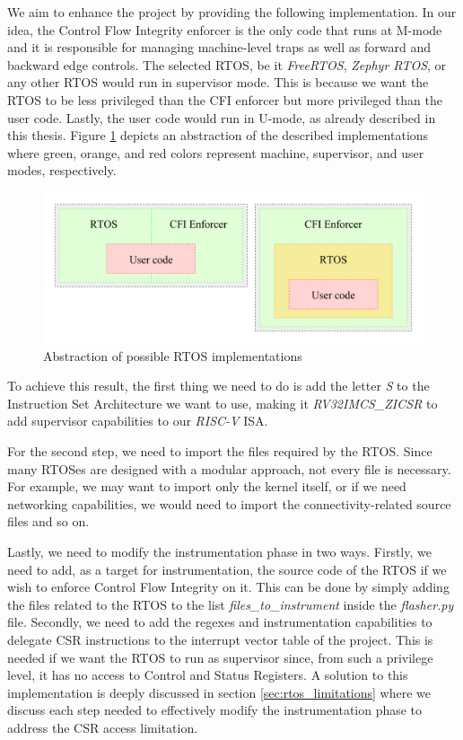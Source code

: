We aim to enhance the project by providing the following implementation. In our
idea, the Control Flow Integrity enforcer is the only code that runs at M-mode and
it is responsible for managing machine-level traps as well as forward and backward
edge controls. The selected RTOS, be it \textit{FreeRTOS}, \textit{Zephyr RTOS},
or any other RTOS would run in supervisor mode. This is because we want the RTOS
to be less privileged than the CFI enforcer but more privileged than the user
code. Lastly, the user code would run in U-mode, as already described in this thesis.
Figure \ref{fig:rtos} depicts an abstraction of the described implementations
where green, orange, and red colors represent machine, supervisor, and user
modes, respectively. \\
\begin{figure}[htbp]
  \centering
  \includegraphics[width=\linewidth]{images/rtos.png}
  \caption{Abstraction of possible RTOS implementations}
  \label{fig:rtos}
\end{figure}

To achieve this result, the first thing we need to do is add the letter \textit{S}
to the Instruction Set Architecture we want to use, making it \textit{RV32IMCS\_ZICSR}
to add supervisor capabilities to our \textit{RISC-V} ISA.

For the second step, we need to import the files required by the RTOS. Since
many RTOSes are designed with a modular approach, not every file is necessary.
For example, we may want to import only the kernel itself, or if we need
networking capabilities, we would need to import the connectivity-related source
files and so on.

Lastly, we need to modify the instrumentation phase in two ways. Firstly, we
need to add, as a target for instrumentation, the source code of the RTOS if we
wish to enforce Control Flow Integrity on it. This can be done by simply adding the
files related to the RTOS to the list \textit{files\_to\_instrument} inside the
\textit{flasher.py} file. Secondly, we need to add the regexes and instrumentation
capabilities to delegate CSR instructions to the interrupt vector table of the project.
This is needed if we want the RTOS to run as supervisor since, from such a privilege
level, it has no access to Control and Status Registers. A solution to this implementation
is deeply discussed in section \ref{sec:rtos_limitations} where we discuss each step
needed to effectively modify the instrumentation phase to address the CSR access
limitation.

